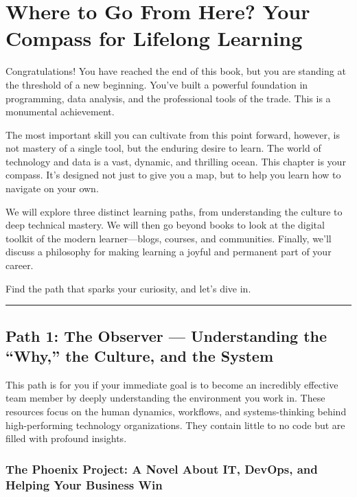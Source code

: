 \documentclass[
  letterpaper,
  DIV=11,
  numbers=noendperiod]{scrreprt}
\begin{document}

\chapter{Where to Go From Here? Your Compass for Lifelong
Learning}\label{where-to-go-from-here-your-compass-for-lifelong-learning}

Congratulations! You have reached the end of this book, but you are
standing at the threshold of a new beginning. You've built a powerful
foundation in programming, data analysis, and the professional tools of
the trade. This is a monumental achievement.

The most important skill you can cultivate from this point forward,
however, is not mastery of a single tool, but the enduring desire to
learn. The world of technology and data is a vast, dynamic, and
thrilling ocean. This chapter is your compass. It's designed not just to
give you a map, but to help you learn how to navigate on your own.

We will explore three distinct learning paths, from understanding the
culture to deep technical mastery. We will then go beyond books to look
at the digital toolkit of the modern learner---blogs, courses, and
communities. Finally, we'll discuss a philosophy for making learning a
joyful and permanent part of your career.

Find the path that sparks your curiosity, and let's dive in.

\begin{center}\rule{0.5\linewidth}{0.5pt}\end{center}

\section{\texorpdfstring{\textbf{Path 1: The Observer --- Understanding
the ``Why,'' the Culture, and the
System}}{Path 1: The Observer --- Understanding the ``Why,'' the Culture, and the System}}\label{path-1-the-observer-understanding-the-why-the-culture-and-the-system}

This path is for you if your immediate goal is to become an incredibly
effective team member by deeply understanding the environment you work
in. These resources focus on the human dynamics, workflows, and
systems-thinking behind high-performing technology organizations. They
contain little to no code but are filled with profound insights.

\subsection{\texorpdfstring{\textbf{The Phoenix Project: A Novel About
IT, DevOps, and Helping Your Business
Win}}{The Phoenix Project: A Novel About IT, DevOps, and Helping Your Business Win}}\label{the-phoenix-project-a-novel-about-it-devops-and-helping-your-business-win}
\end{document}
